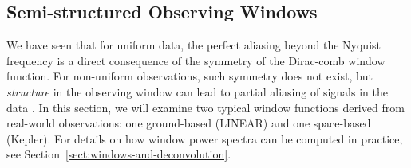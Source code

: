 \documentclass[preprint]{aastex}
\newcommand{\Sect}[1]{Section~\ref{sect:#1}}
\newcommand{\sect}[1]{\Sect{#1}}
\begin{document}


\subsection{Semi-structured Observing Windows}

We have seen that for uniform data, the perfect aliasing beyond the Nyquist
frequency is a direct consequence of the symmetry of the Dirac-comb window
function.
For non-uniform observations, such symmetry does not exist, but {\it structure}
in the observing window can lead to partial aliasing of signals in the
data \citep[see, e.g.][]{Deeming75}.
In this section, we will examine two typical window functions derived from
real-world observations: one ground-based (LINEAR) and one space-based (Kepler).
For details on how window power spectra can be computed in practice, see
\sect{windows-and-deconvolution}.
\end{document}
